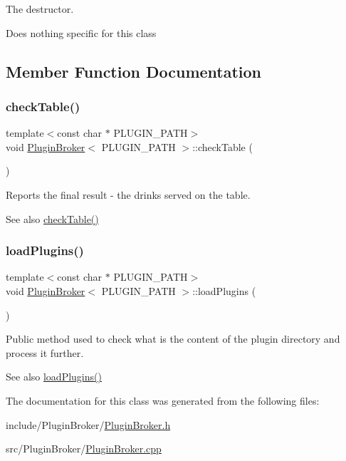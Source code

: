 The destructor. 

Does nothing specific for this class 

\subsection{Member Function Documentation}
\mbox{\label{classPluginBroker_a8444a6a0398adf9f5519f057e697a7fa}} 
\subsubsection{\texorpdfstring{check\+Table()}{checkTable()}}
{\footnotesize\ttfamily template$<$const char $\ast$ P\+L\+U\+G\+I\+N\+\_\+\+P\+A\+TH$>$ \\
void \hyperlink{classPluginBroker}{Plugin\+Broker}$<$ P\+L\+U\+G\+I\+N\+\_\+\+P\+A\+TH $>$\+::check\+Table (\begin{DoxyParamCaption}{ }\end{DoxyParamCaption})}



Reports the final result -\/ the drinks served on the table. 

\begin{DoxySeeAlso}{See also}
\hyperlink{classPluginBroker_a8444a6a0398adf9f5519f057e697a7fa}{check\+Table()} 
\end{DoxySeeAlso}
\mbox{\label{classPluginBroker_a82e9d16e67c3822218b441e76f294539}} 
\subsubsection{\texorpdfstring{load\+Plugins()}{loadPlugins()}}
{\footnotesize\ttfamily template$<$const char $\ast$ P\+L\+U\+G\+I\+N\+\_\+\+P\+A\+TH$>$ \\
void \hyperlink{classPluginBroker}{Plugin\+Broker}$<$ P\+L\+U\+G\+I\+N\+\_\+\+P\+A\+TH $>$\+::load\+Plugins (\begin{DoxyParamCaption}{ }\end{DoxyParamCaption})}



Public method used to check what is the content of the plugin directory and process it further. 

\begin{DoxySeeAlso}{See also}
\hyperlink{classPluginBroker_a82e9d16e67c3822218b441e76f294539}{load\+Plugins()} 
\end{DoxySeeAlso}


The documentation for this class was generated from the following files\+:\begin{DoxyCompactItemize}
\item 
include/\+Plugin\+Broker/\hyperlink{PluginBroker_8h}{Plugin\+Broker.\+h}\item 
src/\+Plugin\+Broker/\hyperlink{PluginBroker_8cpp}{Plugin\+Broker.\+cpp}\end{DoxyCompactItemize}
